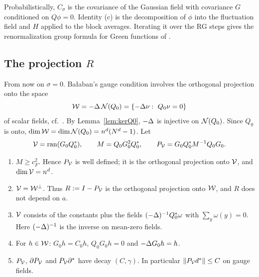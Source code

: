 \begin{remark}\label{x:8.7}
Probabilistically, $C_\sigma$ is the covariance of the Gaussian field with covariance $G$ conditioned on $Q\phi=0$. Identity (c) is the decomposition of $\phi$ into the fluctuation field and $H$ applied to the block averages. Iterating it over the RG steps gives the renormalization group formula for Green functions of \cite[Sect.~2.5]{DST1}.
\end{remark}

\subsection{The projection \texorpdfstring{$R$}{R}}\label{ss:8.5}

From now on $\sigma=0$. Ba\l aban's gauge condition involves the orthogonal projection onto the space
\[
\cW=-\Lap\,\cN(Q_0)=\{-\Lap\nu:\ Q_0\nu=0\}
\]
of scalar fields, cf.\ \cite[(1.38)--(1.44)]{BalPropI}. By Lemma~\ref{lem:kerQ0}, $-\Delta$ is injective on $\mathcal N(Q_0)$. Since $Q_0$ is onto, $\dim\mathcal W=\dim\mathcal N(Q_0)=n^d(N^d-1)$. Let
\[
\mathcal V=\operatorname{ran}(G_0Q_0^*),\qquad M=Q_0G_0^2Q_0^*,\qquad P_\mathcal V=G_0Q_0^*M^{-1}Q_0G_0 .
\]

\begin{proposition}\label{prop:R}
\begin{enumerate}[label=(\alph*)]
\item $M\ge c_F^2$. Hence $P_\mathcal V$ is well defined; it is the orthogonal projection onto $\mathcal V$, and $\dim\mathcal V=n^d$.
\item $\mathcal V=\mathcal W^\perp$. Thus $R:=I-P_\mathcal V$ is the orthogonal projection onto $\mathcal W$, and $R$ does not depend on $a$.
\item $\mathcal V$ consists of the constants plus the fields $(-\Delta)^{-1}Q_0^*\omega$ with $\sum_y\omega(y)=0$. Here $(-\Delta)^{-1}$ is the inverse on mean-zero fields.
\item For $h\in\mathcal W$: $G_0h=C_0h$, $Q_0G_0h=0$ and $-\Delta G_0h=h$.
\item $P_\mathcal V$, $\partial P_\mathcal V$ and $P_\mathcal V\partial^*$ have decay $(C,\gamma)$. In particular $\|P_\mathcal V d^*\|\le C$ on gauge fields.
\end{enumerate}
\end{proposition}

